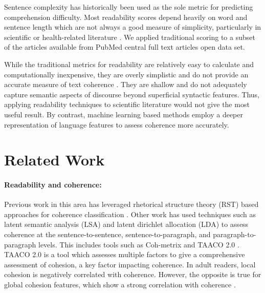 \documentclass[11pt,a4paper]{article}
\begin{document}
Sentence complexity has historically been used as the sole metric for predicting comprehension difficulty. Most readability scores depend heavily on word and sentence length which are not always a good measure of simplicity, particularly in scientific or health-related literature \cite{Kauchak2017-ox}. We applied traditional scoring to a subset of the articles available from PubMed central full text articles open data set.

While the traditional metrics for readability are relatively easy to calculate and computationally inexpensive, they are overly simplistic and do not provide an accurate measure of text coherence \cite{Balyan2020-zr}. They are shallow and do not adequately capture semantic aspects of discourse beyond superficial syntactic features. Thus, applying readability techniques to scientific literature would not give the most useful result. By contrast, machine learning based methods employ a deeper representation of language features to assess coherence more accurately. 

\section{Related Work}

\paragraph{Readability and coherence:}
Previous work in this area has leveraged rhetorical structure theory (RST) based approaches for coherence classification \cite{Guz2020-ap}. Other work has used techniques such as latent semantic analysis (LSA) and latent dirichlet allocation (LDA) to assess coherence at the sentence-to-sentence, sentence-to-paragraph, and paragraph-to-paragraph levels. This includes tools such as Coh-metrix \cite{Graesser2004-lg} and TAACO 2.0 \cite{Crossley2019-ln}. TAACO 2.0 is a tool which assesses multiple factors to give a comprehensive assessment of cohesion, a key factor impacting coherence. In adult readers, local cohesion is negatively correlated with coherence. However, the opposite is true for global cohesion features, which show a strong correlation with coherence \cite{Crossley2019-ln}.
\end{document}
